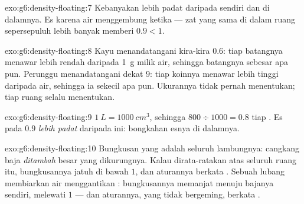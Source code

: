 \begin{solution}{exo:g6:density-floating:7}
Kebanyakan  lebih padat daripada  sendiri dan
 di dalamnya. Es  karena air menggembung ketika
 --- zat yang sama di dalam ruang sepersepuluh lebih banyak
memberi  $0.9 < 1$.
\end{solution}

\begin{solution}{exo:g6:density-floating:8}
Kayu menandatangani kira-kira $0.6$: tiap  batangnya
menawar lebih rendah daripada \qty{1}{g} milik air, sehingga batangnya
 sebesar apa pun. Perunggu menandatangani dekat $9$: tiap
 koinnya menawar lebih tinggi daripada air, sehingga
ia  sekecil apa pun. Ukurannya tidak pernah menentukan;
 tiap ruang selalu menentukan.
\end{solution}

\begin{solution}{exo:g6:density-floating:9}
$\qty{1}{L} = \qty{1000}{cm^3}$, sehingga $800 \div 1000 = 0.8$ 
tiap . Es pada $0.9$ \emph{lebih padat} daripada  ini: bongkahan esnya  di dalamnya.
\end{solution}

\begin{solution}{exo:g6:density-floating:10}
Bungkusan yang  adalah seluruh lambungnya: cangkang baja
\emph{ditambah}   besar yang dikurungnya. Kalau
dirata-ratakan atas seluruh ruang itu,  bungkusannya jatuh
di bawah $1$, dan aturannya berkata . Sebuah lubang membiarkan
air menggantikan :  bungkusannya memanjat menuju
 bajanya sendiri, melewati $1$ --- dan aturannya, yang tidak
bergeming, berkata .
\end{solution}


